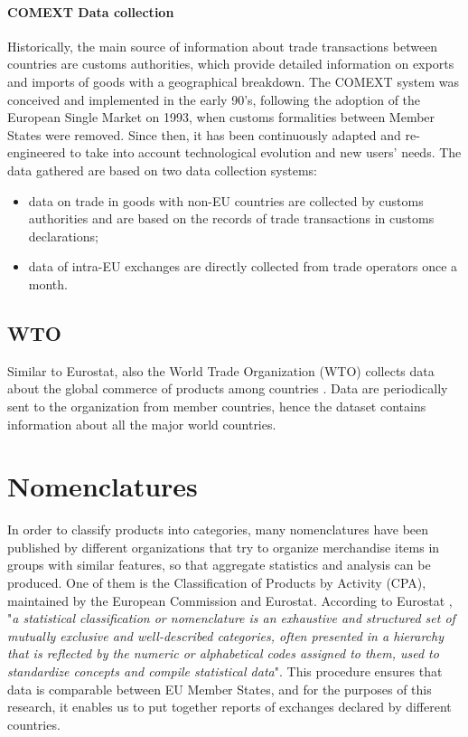 \paragraph{COMEXT Data collection}
Historically, the main source of information about trade transactions between countries are customs authorities, which provide detailed information on exports and imports of goods with a geographical breakdown.
The COMEXT system was conceived and implemented in the early 90's,  following the adoption of the European Single Market on 1993, when customs formalities between Member States were removed. Since then, it has been continuously adapted and re-engineered to take into account technological evolution and new users' needs. The data gathered are based on two data collection systems:
\begin{itemize}
    \item data on trade in goods with non-EU countries are collected by customs authorities and are based on the records of trade transactions in customs declarations;
    \item data of intra-EU exchanges are directly collected from trade operators once a month.
\end{itemize}


\subsection{WTO}
Similar to Eurostat, also the World Trade Organization (WTO) collects data about the global commerce of products among countries \cite{wto2022stats}. Data are periodically sent to the organization from member countries, hence the dataset contains information about all the major world countries.

\section{Nomenclatures}

In order to classify products into categories, many nomenclatures have been published by different organizations that try to organize merchandise items in groups with similar features, so that aggregate statistics and analysis can be produced. One of them is the Classification of Products by Activity (CPA), maintained by the European Commission and Eurostat.
According to Eurostat \cite{eurostat2022website}, "\textit{a statistical classification or nomenclature is an exhaustive and structured set of mutually exclusive and well-described categories, often presented in a hierarchy that is reflected by the numeric or alphabetical codes assigned to them, used to standardize concepts and compile statistical data}".
This procedure ensures that data is comparable between EU Member States, and for the purposes of this research, it enables us to put together reports of exchanges declared by different countries.


